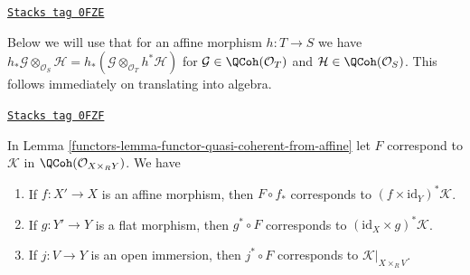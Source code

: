 \begin{remark}
\label{functors-remark-affine-morphism}
\href{https://stacks.math.columbia.edu/tag/0FZE}{\texttt{Stacks tag 0FZE}}

Below we will use that for an affine morphism
$h : T \to S$ we have $h_*\mathcal{G} \otimes_{\mathcal{O}_S} \mathcal{H} =
h_*(\mathcal{G} \otimes_{\mathcal{O}_T} h^*\mathcal{H})$ for
$\mathcal{G} \in \QCoh(\mathcal{O}_T)$ and
$\mathcal{H} \in \QCoh(\mathcal{O}_S)$. This follows
immediately on translating into algebra.
\end{remark}

\begin{lemma}
\label{functors-lemma-functor-quasi-coherent-from-affine-compose}
\href{https://stacks.math.columbia.edu/tag/0FZF}{\texttt{Stacks tag 0FZF}}

In Lemma \ref{functors-lemma-functor-quasi-coherent-from-affine} let $F$
correspond to $\mathcal{K}$ in $\QCoh(\mathcal{O}_{X \times_R Y})$.
We have
\begin{enumerate}
\item If $f : X' \to X$ is an affine morphism, then $F \circ f_*$
corresponds to $(f \times \text{id}_Y)^*\mathcal{K}$.
\item If $g : Y' \to Y$ is a flat morphism, then $g^* \circ F$ corresponds to
$(\text{id}_X \times g)^*\mathcal{K}$.
\item If $j : V \to Y$ is an open immersion, then $j^* \circ F$
corresponds to $\mathcal{K}|_{X \times_R V}$.
\end{enumerate}
\end{lemma}

